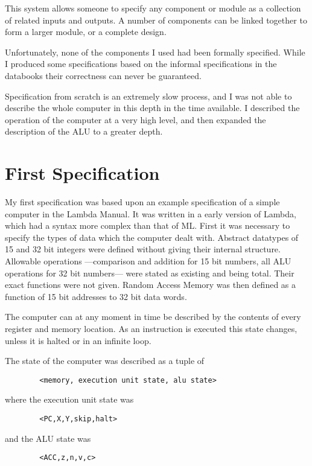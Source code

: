 This system allows someone to specify any component  or module as a collection of related inputs and outputs.
A number of components can  be linked together to form a larger module,
or a complete design.
	
Unfortunately, none of  the components I used had  
been formally specified. While I  produced some specifications based on the informal specifications in the databooks their correctness  can never be guaranteed. 


Specification from scratch is an extremely slow process, and I was not able to describe the whole computer in this depth in the time available.
 I  described the operation of the computer at a very high level, and then  expanded the description of the ALU to a greater depth.

\section {First Specification} 

My first specification was based upon an example specification of a simple computer in the Lambda Manual.
It was written in a early version of Lambda, which had a syntax more complex than that of ML.
First it was necessary to specify the types of data which the computer dealt with. 
Abstract datatypes of 15 and 32 bit integers were defined without giving their internal structure.
Allowable 
operations ---comparison and addition for 15 bit numbers, all ALU 
operations for 32 bit numbers--- were stated as existing and being 
total. Their exact functions were not given.
 Random Access Memory 
was then defined as a function of 15 bit addresses to  32 bit data words. 

The computer can at any moment in time  be described by  the contents of every  register
and  memory location.
 As an instruction is executed this state   changes,
unless it is halted or in an infinite loop.

The state of the 
computer was described as a tuple of
\begin{verbatim}
        <memory, execution unit state, alu state> 
\end{verbatim}
where the execution unit state was 
\begin{verbatim}
        <PC,X,Y,skip,halt>
\end{verbatim}
    and the
ALU state was
\begin{verbatim}
        <ACC,z,n,v,c>
\end{verbatim}
 


